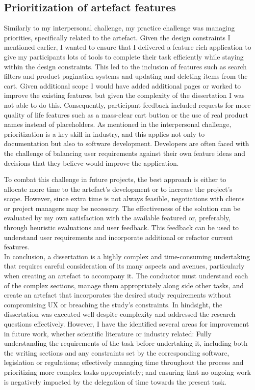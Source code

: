 \documentclass[article]{IEEEtran}
\begin{document}
            \subsection{Prioritization of artefact features}
                Similarly to my interpersonal challenge, my practice challenge was managing priorities, specifically related to the artefact. Given the design constraints I mentioned earlier, I wanted to ensure that I delivered a feature rich application to give my participants lots of tools to complete their task efficiently while staying within the design constraints. This led to the inclusion of features such as search filters and product pagination systems and updating and deleting items from the cart. Given additional scope I would have added additional pages or worked to improve the existing features, but given the complexity of the dissertation I was not able to do this. Consequently, participant feedback included requests for more quality of life features such as a mass-clear cart button or the 
                use of real product names instead of placeholders. As mentioned in the interpersonal challenge, prioritization is a key skill in industry, and this applies not only to documentation but also to software development. Developers are often faced with the challenge of balancing user requirements against their own feature ideas and decisions that they believe would improve the application.
    
                To combat this challenge in future projects, the best approach is either to allocate more time to the artefact's development or to increase the project's scope. However, since extra time is not always feasible, negotiations with clients or project managers may be necessary. The  effectiveness of the solution can be evaluated by my own satisfaction with the available featured or, preferably, through heuristic evaluations and user feedback. This feedback can be used to understand user requirements and incorporate additional or refactor current features. \\

            In conclusion, a dissertation is a highly complex and time-consuming undertaking that requires careful consideration of its many aspects and avenues, particularly when creating an artefact to accompany it. The conductor must understand each of the complex sections, manage them appropriately along side other tasks, and create an artefact that incorporates the desired study requirements without compromising UX or breaching the study's constraints. In hindsight, the dissertation was executed well despite complexity and addressed the research questions effectively. However, I have the identified several areas for improvement in future work, whether scientific literature or industry related: Fully understanding the requirements of the task before undertaking it, including both the writing sections and any constraints set by the corresponding software, legislation or regulations; effectively managing time throughout the process and prioritizing more complex tasks appropriately; and ensuring that no ongoing work is negatively impacted by the delegation of time towards the present task.
\end{document}

